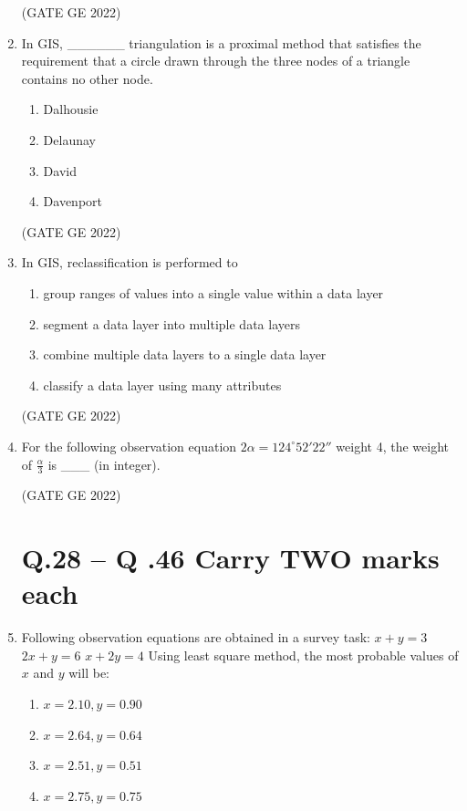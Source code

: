 \documentclass[a4paper, 11pt]{article}
\begin{document}
\begin{enumerate}
\hfill (GATE GE 2022)

\item In GIS, \_\_\_\_\_\_ triangulation is a proximal method that satisfies the requirement that a circle drawn through the three nodes of a triangle contains no other node.
\begin{enumerate}
    \item Dalhousie
    \item Delaunay
    \item David
    \item Davenport
\end{enumerate}

\hfill (GATE GE 2022)

\item In GIS, reclassification is performed to
\begin{enumerate}
    \item group ranges of values into a single value within a data layer
    \item segment a data layer into multiple data layers
    \item combine multiple data layers to a single data layer
    \item classify a data layer using many attributes
\end{enumerate}

\hfill (GATE GE 2022)

\item For the following observation equation
$2\alpha = 124^\circ 52' 22''$        weight 4,
the weight of $\frac{\alpha}{3}$ is \_\_\_ (in integer).

\hfill (GATE GE 2022)

\section{\textbf{Q.28 – Q .46 Carry TWO marks each}}

\item Following observation equations are obtained in a survey task:  
$x + y = 3$  
$2x + y = 6$  
$x + 2y = 4$  
Using least square method, the most probable values of $x$ and $y$ will be:
\begin{enumerate}
    \item $x = 2.10, y = 0.90$
    \item $x = 2.64, y = 0.64$
    \item $x = 2.51, y = 0.51$
    \item $x = 2.75, y = 0.75$
\end{enumerate}


\end{enumerate}
\end{document}

